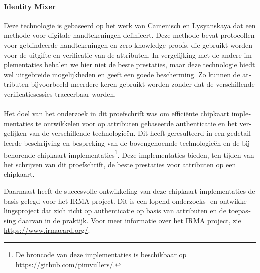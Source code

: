 \begin{otherlanguage}{dutch}
\paragraph{Identity Mixer}
Deze technologie is gebaseerd op het werk van Camenisch en Lysyanskaya dat een 
methode voor digitale handtekeningen definieert. Deze methode bevat protocollen
voor geblindeerde handtekeningen en zero-knowledge proofs, die gebruikt worden 
voor de uitgifte en verificatie van de attributen. In vergelijking met de andere
implementaties behalen we hier niet de beste prestaties, maar deze technologie 
biedt wel uitgebreide mogelijkheden en geeft een goede bescherming. Zo kunnen de
attributen bijvoorbeeld meerdere keren gebruikt worden zonder dat de 
verschillende verificatiesessies traceerbaar worden.

\paragraph{}
Het doel van het onderzoek in dit proefschrift was om effici\"{e}nte 
chipkaart implementaties te ontwikkelen voor op attributen gebaseerde 
authenticatie en het vergelijken van de verschillende technologie\"{e}n.
Dit heeft geresulteerd in een gedetailleerde beschrijving en bespreking van de 
bovengenoemde technologie\"{e}n en de bijbehorende chipkaart implementaties\footnote{De broncode van deze implementaties is beschikbaar op \url{https://github.com/pimvullers/}.}. Deze implementaties bieden, ten tijden van het schrijven van dit proefschrift, de beste prestaties voor 
attributen op een chipkaart.

Daarnaast heeft de succesvolle ontwikkeling van deze chipkaart implementaties 
de basis gelegd voor het IRMA project. Dit is een lopend onderzoeks- en 
ontwikkelingsproject dat zich richt op authenticatie op basis van attributen en 
de toepassing daarvan in de praktijk. Voor meer informatie over het IRMA 
project, zie \url{https://www.irmacard.org/}.

\end{otherlanguage}

\cleardoublepage
